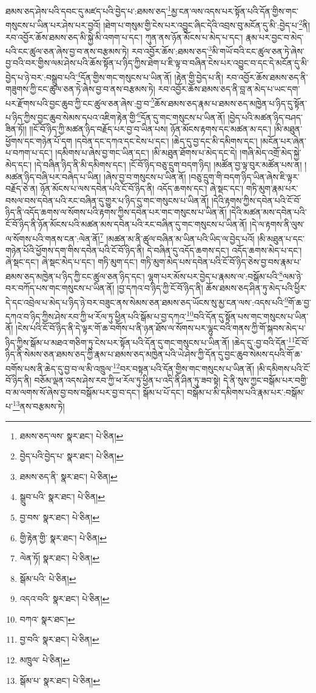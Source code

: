 ཐམས་ཅད་ཤེས་པའི་དབང་དུ་མཛད་པའི་བྱེད་པ་:ཐམས་ཅད་\footnote{ཐམས་ཅད་ལས་  སྣར་ཐང་།  པེ་ཅིན། }མྱ་ངན་ལས་འདས་པར་སྟོན་པའི་དོན་གྱིས་གང་གསུངས་པ་ཡིན་པར་ཤེས་པར་བྱའོ། །ཐེག་པ་གསུམ་གྱི་ངེས་པར་འབྱུང་ཞིང་དེའི་འབྲས་བུ་མངོན་དུ་མི་:བྱེད་པ་\footnote{བྱེད་པའི་བྱེད་པ་  སྣར་ཐང་།  པེ་ཅིན། }ནི། རབ་འབྱོར་ཆོས་ཐམས་ཅད་མི་སྐྱེ་མི་འགག་པ་དང་། ཀུན་ནས་ཉོན་མོངས་པ་མེད་པ་དང་། རྣམ་པར་བྱང་བ་མེད་པའི་ངང་ཚུལ་ཅན་ཞེས་བྱ་བ་ནས་བརྩམས་ཏེ། རབ་འབྱོར་ཆོས་:ཐམས་ཅད་\footnote{ཐམས་ཅད་ནི་  སྣར་ཐང་།  པེ་ཅིན། }མི་གཡོ་བའི་ངང་ཚུལ་ཅན་ཏེ་ཞེས་བྱ་བའི་བར་གྱིས་ལམ་ཤེས་པའི་ཆོས་སྟོན་པ་ཉིད་ཀྱིས་ཐེག་པ་ཇི་ལྟ་བ་བཞིན་ངེས་པར་འབྱུང་བ་དང་དེ་མངོན་དུ་མི་བྱེད་པ་ཉེ་བར་:བསྒྲུབ་པའི་\footnote{སྒྲུབ་པའི་  སྣར་ཐང་།  པེ་ཅིན། }དོན་གྱིས་གང་གསུངས་པ་ཡིན་ནོ། །རྟེན་གྱི་བྱེད་པ་ནི། རབ་འབྱོར་ཆོས་ཐམས་ཅད་ནི་གཟུགས་ཀྱི་ངང་ཚུལ་ཅན་ཏེ་ཞེས་བྱ་བ་ནས་བརྩམས་ཏེ། རབ་འབྱོར་ཆོས་ཐམས་ཅད་ནི་བླ་ན་མེད་པ་ཡང་དག་པར་རྫོགས་པའི་བྱང་ཆུབ་ཀྱི་ངང་ཚུལ་ཅན་ཞེས་:བྱ་བ་\footnote{བྱ་བས་  སྣར་ཐང་།  པེ་ཅིན། }ཆོས་ཐམས་ཅད་རྣམ་པ་ཐམས་ཅད་མཁྱེན་པ་ཉིད་དུ་སྟོན་པ་ཉིད་ཀྱིས་བྱང་ཆུབ་སེམས་དཔའ་འཇིག་རྟེན་གྱི་\footnote{གྱི་རྟེན་གྱི་  སྣར་ཐང་།  པེ་ཅིན། }དོན་དུ་གང་གསུངས་པ་ཡིན་ནོ། །བྱེད་པའི་མཚན་ཉིད་བཤད་ཟིན་ཏོ།། །།ངོ་བོ་ཉིད་ཀྱི་མཚན་ཉིད་བརྗོད་པར་བྱ་བ་ཡིན་པས། ཉོན་མོངས་རྟགས་དང་མཚན་མ་དང་། །མི་མཐུན་ཕྱོགས་དང་གཉེན་པོ་དག །དབེན་དང་དཀའ་དང་ངེས་པ་དང་། །ཆེད་དུ་བྱ་དང་མི་དམིགས་དང་། །མངོན་པར་ཞེན་པ་བཀག་པ་དང་། །དམིགས་པ་ཞེས་བྱ་གང་ཡིན་དང་། །མི་མཐུན་ཐོགས་པ་མེད་དང་དེ། །གཞི་མེད་འགྲོ་མེད་སྐྱེ་མེད་དང་། །དེ་བཞིན་ཉིད་ནི་མི་དམིགས་དང་། །ངོ་བོ་ཉིད་བཅུ་དྲུག་བདག་ཉིད། །མཚོན་བྱ་ལྟ་བུར་མཚོན་པས་ན། །མཚན་ཉིད་བཞི་པར་བཞེད་པ་ཡིན། །ཞེས་བྱ་བ་གསུངས་པ་ཡིན་ནོ། །བཅུ་དྲུག་གི་བདག་ཉིད་ཡིན་ཞེས་ཇི་ལྟར་བརྗོད་ཅེ་ན། ཉོན་མོངས་པ་ལས་དབེན་པའི་ངོ་བོ་ཉིད་ནི། འདོད་ཆགས་དང་། ཞེ་སྡང་དང་། གཏི་མུག་རྣམ་པར་བསལ་བས་དབེན་པའི་རང་བཞིན་དུ་གྱུར་པ་ཉིད་དུ་གང་གསུངས་པ་ཡིན་ནོ། །དེའི་རྟགས་ཀྱིས་དབེན་པའི་ངོ་བོ་ཉིད་ནི་འདོད་ཆགས་ལ་སོགས་པའི་རྟགས་ཀྱིས་དབེན་པར་གང་གསུངས་པ་ཡིན་ནོ། །དེའི་མཚན་མས་དབེན་པའི་ངོ་བོ་ཉིད་ནི་ཉོན་མོངས་པའི་མཚན་མས་དབེན་པའི་རང་བཞིན་དུ་གང་གསུངས་པ་ཡིན་ནོ། །དེ་ལ་རྟགས་ནི་ལུས་ལ་སོགས་པའི་གནས་ངན་:ལེན་ནོ།\footnote{ལེན་ཏོ།  སྣར་ཐང་།  པེ་ཅིན། } །མཚན་མ་ནི་ཚུལ་བཞིན་མ་ཡིན་པའི་ཡིད་ལ་བྱེད་པའོ། །མི་མཐུན་པ་དང་གཉེན་པོའི་ཕྱོགས་དག་གིས་དབེན་པའི་ངོ་བོ་ཉིད་ནི། དེ་བཞིན་དུ་འདོད་ཆགས་དང་། འདོད་ཆགས་མེད་པ་དང་། ཞེ་སྡང་དང་། ཞེ་སྡང་མེད་པ་དང་། གཏི་མུག་དང་། གཏི་མུག་མེད་པས་དབེན་པའི་ངོ་བོ་ཉིད་ཅེས་བྱ་བས་རྣམ་པ་ཐམས་ཅད་མཁྱེན་པ་ཉིད་ཀྱི་ངང་ཚུལ་ཅན་ཉིད་དང་། ལྷག་པར་མོས་པར་བྱེད་པ་རྣམས་ལ་:བསྒོམ་པའི་\footnote{སྒོམ་པའི་  པེ་ཅིན། }ལམ་ཉེ་བར་བཀོད་པས་གང་གསུངས་པ་ཡིན་ནོ། །བྱ་དཀའ་བ་ཉིད་ཀྱི་ངོ་བོ་ཉིད་ནི། ཆོས་ཐམས་ཅད་ཤིན་ཏུ་མེད་པའི་ཕྱིར་དེ་དང་འབྲེལ་པ་མེད་པ་ཉིད་ཉེ་བར་བཟུང་ནས་སེམས་ཅན་ཐམས་ཅད་ཡོངས་སུ་མྱ་ངན་ལས་:འདས་པའི་\footnote{འདའ་བའི་  སྣར་ཐང་།  པེ་ཅིན། }གོ་ཆ་བྱ་དཀའ་བ་ཉིད་ཀྱིས་ཤེས་རབ་ཀྱི་ཕ་རོལ་ཏུ་ཕྱིན་པའི་སྒོམ་པ་བྱ་དཀའ་\footnote{བཀའ་  སྣར་ཐང་། }བའི་དོན་དུ་སྟོན་པས་གང་གསུངས་པ་ཡིན་ནོ། །ངེས་པའི་ངོ་བོ་ཉིད་ནི་དེ་ལྟར་གོ་ཆ་བགོས་པ་ནི་ཉན་ཐོས་ལ་སོགས་པར་ལྷུང་བའི་གནས་ཀྱི་གོ་སྐབས་མེད་པ་ཉིད་ཀྱིས་སྒོམ་པ་མཐའ་གཅིག་ཏུ་ངེས་པར་སྟོན་པའི་དོན་དུ་གང་གསུངས་པ་ཡིན་ནོ། །ཆེད་དུ་:བྱ་བའི་དོན་\footnote{བྱ་བའི་  སྣར་ཐང་།  པེ་ཅིན། }ངོ་བོ་ཉིད་ནི་སེམས་ཅན་ཐམས་ཅད་ཀྱི་རྣམ་པ་ཐམས་ཅད་མཁྱེན་པའི་ཡེ་ཤེས་ཀྱི་དོན་དུ་བྱང་ཆུབ་སེམས་དཔའི་གོ་ཆ་བགོས་པས་ནི་ཆེད་དུ་བྱ་བ་ལ་མི་འཁྲུལ་\footnote{མཁྲུལ་  པེ་ཅིན། }བར་བསྟན་པའི་དོན་གྱིས་གང་གསུངས་པ་ཡིན་ནོ། །མི་དམིགས་པའི་ངོ་བོ་ཉིད་ནི། བཅོམ་ལྡན་འདས་ཤེས་རབ་ཀྱི་ཕ་རོལ་ཏུ་ཕྱིན་པ་འདི་ནི་ཤིན་ཏུ་ཟབ་སྟེ། དེ་ནི་སུས་ཀྱང་བསྒོམ་པར་བགྱི་བ་མ་ལགས་སོ་ཞེས་བྱ་བས་བསྒོམ་པར་བྱ་བ་དང་། སྒོམ་པ་པོ་དང་། བསྒོམ་པ་མི་དམིགས་པའི་རྣམ་པར་:བསྒོམ་པ་\footnote{སྒོམ་པ་  སྣར་ཐང་།  པེ་ཅིན། }ནས་བརྩམས་ཏེ། 